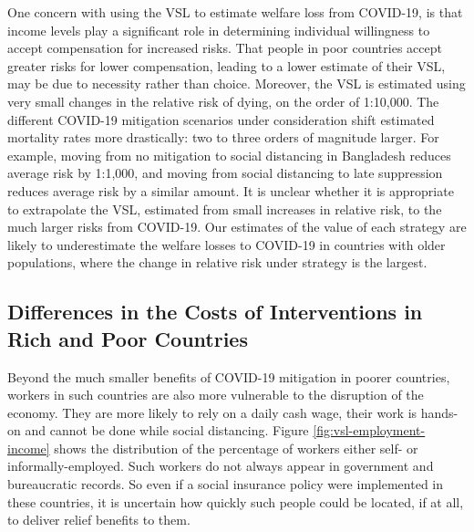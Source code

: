 \documentclass[11pt]{article}
\begin{document}
One concern with using the VSL to estimate welfare loss from COVID-19, is that income levels play a significant role in determining individual willingness to accept compensation for increased risks. That people in poor countries accept greater risks for lower compensation, leading to a lower estimate of their VSL, may be due to necessity rather than choice. Moreover, the VSL is estimated using very small changes in the relative risk of dying, on the order of 1:10,000. The different COVID-19 mitigation scenarios under consideration shift estimated mortality rates more drastically: two to three orders of magnitude larger. For example, moving from no mitigation to social distancing in Bangladesh reduces average risk by 1:1,000, and moving from social distancing to late suppression reduces average risk by a similar amount. It is unclear whether it is appropriate to extrapolate the  VSL, estimated from small increases in relative risk, to the much larger risks from COVID-19. Our estimates of the value of each strategy are likely to underestimate the welfare losses to COVID-19 in countries with older populations, where the change in relative risk under strategy is the largest.

\subsection{Differences in the Costs of Interventions in Rich and Poor Countries}

Beyond the much smaller benefits of COVID-19 mitigation in poorer countries, workers in such countries are also more vulnerable to the disruption of the economy. They are more likely to rely on a daily cash wage, their work is hands-on and cannot be done while social distancing. Figure \ref{fig:vsl-employment-income} shows the distribution of the percentage of workers either self- or informally-employed. Such workers do not always appear in government and bureaucratic records. So even if a social insurance policy were implemented in these countries, it is uncertain how quickly such people could be located, if at all, to deliver relief benefits to them.
\end{document}
